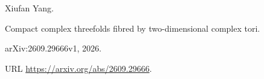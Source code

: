 Xiufan Yang.

\newblock Compact complex threefolds fibred by two-dimensional complex tori.

\newblock arXiv:2609.29666v1, 2026.

\newblock URL \url{https://arxiv.org/abs/2609.29666}.
